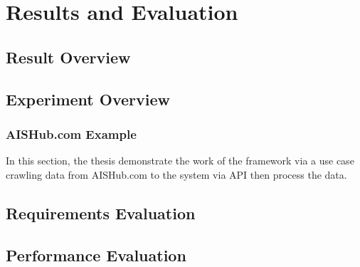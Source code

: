 \chapter{Results and Evaluation} \label{chap:results}
\section{Result Overview}
\section{Experiment Overview}
\subsection{AISHub.com Example}

In this section, the thesis demonstrate the work of the framework via a use case crawling data from AISHub.com to the system via API then process the data.
















\section{Requirements Evaluation}
















\section{Performance Evaluation}
